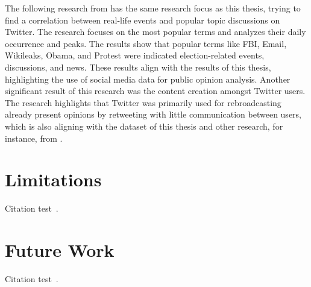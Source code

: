 The following research from \textcite{yaqub_US_election_analysis_2017} has the same research focus as 
this thesis, trying to find a correlation between real-life events and popular topic discussions on 
Twitter. The research focuses on the most popular terms and analyzes their daily occurrence and peaks. 
The results show that popular terms like FBI, Email, Wikileaks, Obama, and Protest were indicated 
election-related events, discussions, and news. These results align with the results of this thesis, 
highlighting the use of social media data for public opinion analysis. Another significant result of 
this research was the content creation amongst Twitter users. The research highlights that Twitter was 
primarily used for rebroadcasting already present opinions by retweeting with little communication 
between users, which is also aligning with the dataset of this thesis and other research, for 
instance, from \textcite{pfeffer_twitter_24_Hours_just_another_day_2023}.


\section{Limitations}
Citation test~\parencite{latex}.

\section{Future Work}\label{section:future_work}
Citation test~\parencite{latex}.
